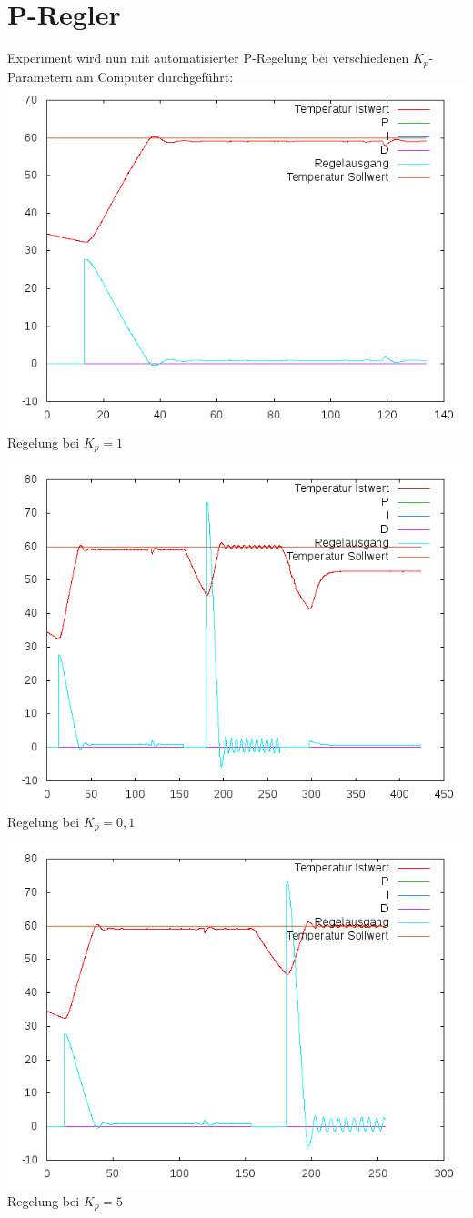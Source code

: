 \documentclass[compress,11pt]{beamer}
\begin{document}
\section{P-Regler}
\begin{frame}
Experiment wird nun mit automatisierter P-Regelung bei verschiedenen $K_p$-Parametern am Computer durchgeführt:\\

\includegraphics[width=.7\textwidth]{../2aufgabe/2bk1}\\
Regelung bei $K_p = 1$
\end{frame}
\begin{frame}

\includegraphics[width=.7\textwidth]{../2aufgabe/2bk,1}\\
Regelung bei $K_p = 0,1$
\end{frame}
\begin{frame}

\includegraphics[width=.7\textwidth]{../2aufgabe/2bk5}\\
Regelung bei $K_p = 5$
\end{frame}
\end{document}
